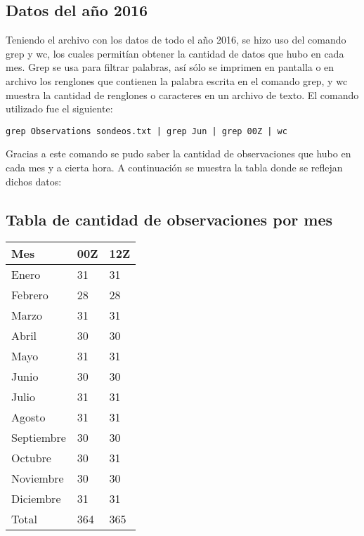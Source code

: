 \documentclass[12pt]{article}
\begin{document}
\begin{doublespace}
\subsection{Datos del año 2016}
Teniendo el archivo con los datos de todo el año 2016, se hizo uso del comando grep y wc, los cuales permitían obtener la cantidad de datos que hubo en cada mes. Grep se usa para filtrar palabras, así sólo se imprimen en pantalla o en archivo los renglones que contienen la palabra escrita en el comando grep, y wc muestra la cantidad de renglones o caracteres en un archivo de texto. El comando utilizado fue el siguiente:

\begin{verbatim}
grep Observations sondeos.txt | grep Jun | grep 00Z | wc
\end{verbatim}

Gracias a este comando se pudo saber la cantidad de observaciones que hubo en cada mes y a cierta hora. A continuación se muestra la tabla donde se reflejan dichos datos:

\pagebreak

\begin{center}
\subsection*{Tabla de cantidad de observaciones por mes}
\end{center}
\begin{table}[htbp]
\begin{center}
\begin{tabular}{|l|l|l|}
\hline \hline
Mes & 00Z & 12Z  \\
\hline \hline
Enero & 31 & 31 \\ \hline
Febrero & 28 & 28\\ \hline
Marzo & 31 & 31\\ \hline
Abril & 30 & 30 \\ \hline
Mayo & 31 & 31 \\ \hline
Junio & 30 & 30 \\ \hline
Julio & 31 & 31 \\ \hline
Agosto & 31 & 31 \\ \hline
Septiembre & 30 & 30 \\ \hline
Octubre & 30 & 31 \\ \hline
Noviembre & 30 & 30 \\ \hline
Diciembre & 31 & 31 \\ \hline
Total & 364 & 365 \\ \hline
\end{tabular}
\label{tabla:sencilla}
\end{center}
\end{table}


\end{doublespace}
\end{document}
